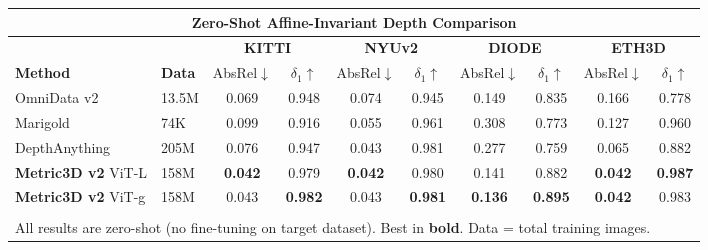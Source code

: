 \documentclass[border=10pt]{standalone}
\begin{document}
\begin{tabular}{@{} l l c c c c c c c c @{}}
\toprule
\multicolumn{10}{c}{\textbf{\color{garnet}\textsf{\large Zero-Shot Affine-Invariant Depth Comparison}}} \\[4pt]
\midrule
& & \multicolumn{2}{c}{\textsf{\textbf{KITTI}}} & \multicolumn{2}{c}{\textsf{\textbf{NYUv2}}} & \multicolumn{2}{c}{\textsf{\textbf{DIODE}}} & \multicolumn{2}{c}{\textsf{\textbf{ETH3D}}} \\
\cmidrule(lr){3-4} \cmidrule(lr){5-6} \cmidrule(lr){7-8} \cmidrule(lr){9-10}
\textsf{\textbf{Method}} & \textsf{\textbf{Data}} & \textsf{AbsRel$\downarrow$} & \textsf{$\delta_1$$\uparrow$} & \textsf{AbsRel$\downarrow$} & \textsf{$\delta_1$$\uparrow$} & \textsf{AbsRel$\downarrow$} & \textsf{$\delta_1$$\uparrow$} & \textsf{AbsRel$\downarrow$} & \textsf{$\delta_1$$\uparrow$} \\
\midrule
\textsf{OmniData v2}       & \textsf{13.5M} & 0.069 & 0.948 & 0.074 & 0.945 & 0.149 & 0.835 & 0.166 & 0.778 \\
\textsf{Marigold}           & \textsf{74K}   & 0.099 & 0.916 & 0.055 & 0.961 & 0.308 & 0.773 & 0.127 & 0.960 \\
\textsf{DepthAnything}      & \textsf{205M}  & 0.076 & 0.947 & 0.043 & 0.981 & 0.277 & 0.759 & 0.065 & 0.882 \\
\midrule
\rowcolor{highlight} \textsf{\textbf{Metric3D v2} ViT-L} & \textsf{158M} & \textbf{0.042} & 0.979 & \textbf{0.042} & 0.980 & 0.141 & 0.882 & \textbf{0.042} & \textbf{0.987} \\
\rowcolor{highlight} \textsf{\textbf{Metric3D v2} ViT-g} & \textsf{158M} & 0.043 & \textbf{0.982} & 0.043 & \textbf{0.981} & \textbf{0.136} & \textbf{0.895} & \textbf{0.042} & 0.983 \\
\bottomrule
\\[-4pt]
\multicolumn{10}{l}{\scriptsize\textsf{All results are zero-shot (no fine-tuning on target dataset). Best in \textbf{bold}. Data = total training images.}} \\
\end{tabular}
\end{document}
